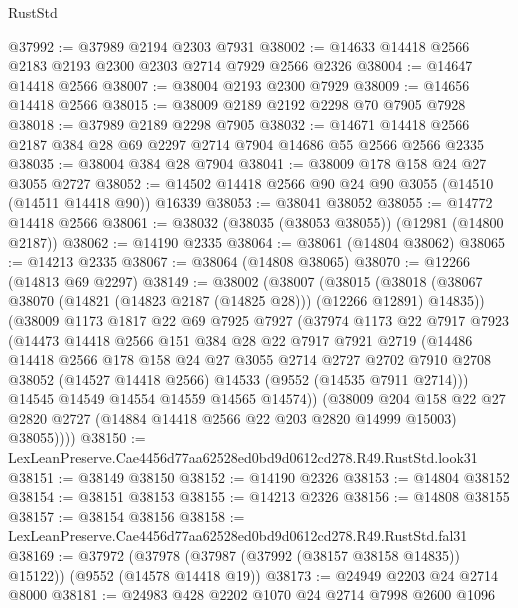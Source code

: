\begin{lexlean}{RustStd}
\begin{coremodule}
@37992 := @37989 @2194 @2303 @7931
@38002 := @14633 @14418 @2566 @2183 @2193 @2300 @2303 @2714 @7929 @2566 @2326
@38004 := @14647 @14418 @2566
@38007 := @38004 @2193 @2300 @7929
@38009 := @14656 @14418 @2566
@38015 := @38009 @2189 @2192 @2298 @70 @7905 @7928
@38018 := @37989 @2189 @2298 @7905
@38032 := @14671 @14418 @2566 @2187 @384 @28 @69 @2297 @2714 @7904 @14686 @55 @2566 @2566 @2335
@38035 := @38004 @384 @28 @7904
@38041 := @38009 @178 @158 @24 @27 @3055 @2727
@38052 := @14502 @14418 @2566 @90 @24 @90 @3055 (@14510 (@14511 @14418 @90)) @16339
@38053 := @38041 @38052
@38055 := @14772 @14418 @2566
@38061 := @38032 (@38035 (@38053 @38055)) (@12981 (@14800 @2187))
@38062 := @14190 @2335
@38064 := @38061 (@14804 @38062)
@38065 := @14213 @2335
@38067 := @38064 (@14808 @38065)
@38070 := @12266 (@14813 @69 @2297)
@38149 := @38002
    (@38007
      (@38015
        (@38018 (@38067 @38070 (@14821 (@14823 @2187 (@14825 @28))) (@12266 @12891) @14835))
        (@38009
          @1173
          @1817
          @22
          @69
          @7925
          @7927
          (@37974
            @1173
            @22
            @7917
            @7923
            (@14473
              @14418
              @2566
              @151
              @384
              @28
              @22
              @7917
              @7921
              @2719
              (@14486
                @14418
                @2566
                @178
                @158
                @24
                @27
                @3055
                @2714
                @2727
                @2702
                @7910
                @2708
                @38052
                (@14527 @14418 @2566)
                @14533
                (@9552 (@14535 @7911 @2714)))
              @14545
              @14549
              @14554
              @14559
              @14565
              @14574))
          (@38009
            @204
            @158
            @22
            @27
            @2820
            @2727
            (@14884 @14418 @2566 @22 @203 @2820 @14999 @15003)
            @38055))))
@38150 := LexLeanPreserve.Cae4456d77aa62528ed0bd9d0612cd278.R49.RustStd.look31
@38151 := @38149 @38150
@38152 := @14190 @2326
@38153 := @14804 @38152
@38154 := @38151 @38153
@38155 := @14213 @2326
@38156 := @14808 @38155
@38157 := @38154 @38156
@38158 := LexLeanPreserve.Cae4456d77aa62528ed0bd9d0612cd278.R49.RustStd.fal31
@38169 := @37972
    (@37978 (@37987 (@37992 (@38157 @38158 @14835)) @15122))
    (@9552 (@14578 @14418 @19))
@38173 := @24949 @2203 @24 @2714 @8000
@38181 := @24983 @428 @2202 @1070 @24 @2714 @7998 @2600 @1096

\end{coremodule}
\end{lexlean}
